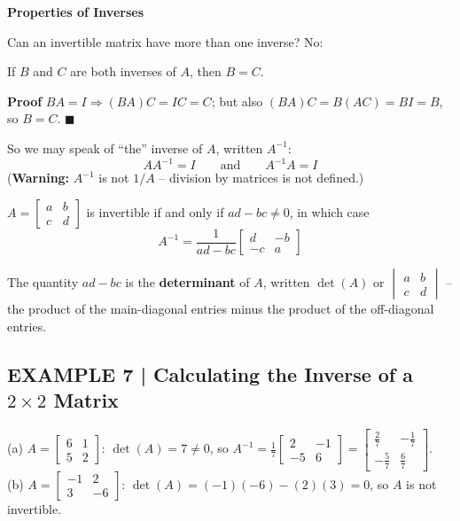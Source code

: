 \documentclass{article}
\newcommand{\redheading}[1]{{\vspace{2mm}\noindent\Large\bfseries\color{red!55!black} #1\par}\vspace{2mm}}
\theoremstyle{mystyle}
\begin{document}
\redheading{Properties of Inverses}

Can an invertible matrix have more than one inverse? No:

\begin{tcolorbox}[colback=red!4, colframe=red!60!black, title=Theorem 1.4.4, boxrule=0.5mm, arc=3mm]
If $B$ and $C$ are both inverses of $A$, then $B=C$.
\end{tcolorbox}
\textbf{Proof} $BA=I\Rightarrow(BA)C=IC=C$; but also $(BA)C=B(AC)=BI=B$, so $B=C$. $\blacksquare$

So we may speak of ``the'' inverse of $A$, written $A^{-1}$:
\[
AA^{-1}=I\qquad\text{and}\qquad A^{-1}A=I \tag{1}
\]
(\textbf{Warning:} $A^{-1}$ is not $1/A$ -- division by matrices is not defined.)

\begin{tcolorbox}[colback=red!4, colframe=red!60!black, title=Theorem 1.4.5, boxrule=0.5mm, arc=3mm]
$A=\begin{bmatrix}a&b\\c&d\end{bmatrix}$ is invertible if and only if $ad-bc\ne0$, in which case
\[
A^{-1}=\frac{1}{ad-bc}\begin{bmatrix}d&-b\\-c&a\end{bmatrix} \tag{2}
\]
\end{tcolorbox}
The quantity $ad-bc$ is the \textbf{determinant} of $A$, written $\det(A)$ or $\begin{vmatrix}a&b\\c&d\end{vmatrix}$ -- the product of the main-diagonal entries minus the product of the off-diagonal entries.

\subsection*{EXAMPLE 7 | Calculating the Inverse of a $2\times2$ Matrix}
(a) $A=\begin{bmatrix}6&1\\5&2\end{bmatrix}$: $\det(A)=7\ne0$, so $A^{-1}=\tfrac17\begin{bmatrix}2&-1\\-5&6\end{bmatrix}=\begin{bmatrix}\tfrac27&-\tfrac17\\-\tfrac57&\tfrac67\end{bmatrix}$.\\
(b) $A=\begin{bmatrix}-1&2\\3&-6\end{bmatrix}$: $\det(A)=(-1)(-6)-(2)(3)=0$, so $A$ is not invertible.
\end{document}
